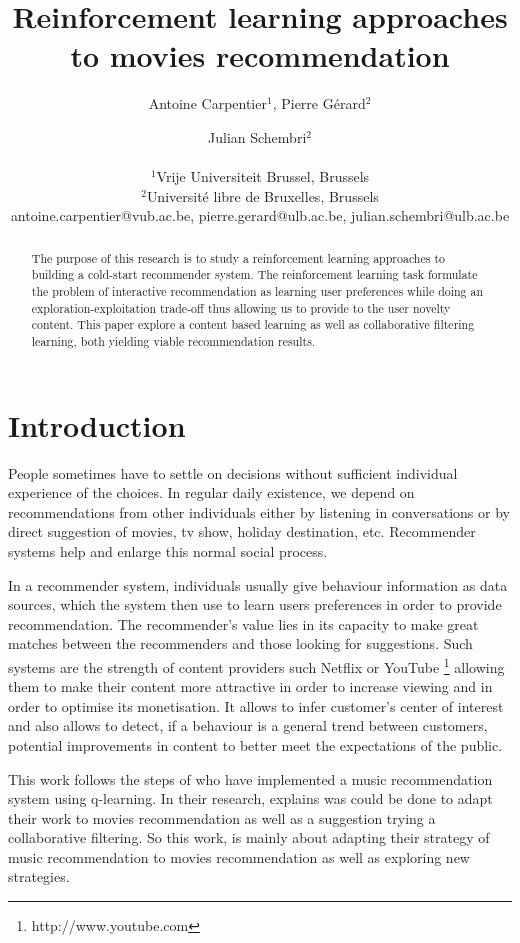 \documentclass[letterpaper]{article}
\title{Reinforcement learning approaches to movies recommendation}
\author{Antoine Carpentier$^{1}$, Pierre Gérard$^{2}$ \and Julian Schembri$^2$ \\
\mbox{}\\
$^1$Vrije Universiteit Brussel, Brussels \\
$^2$Université libre de Bruxelles, Brussels \\
antoine.carpentier@vub.ac.be, pierre.gerard@ulb.ac.be, julian.schembri@ulb.ac.be}
\begin{document}
\maketitle

\begin{abstract}
  The purpose of this research is to study a reinforcement learning approaches to building a cold-start recommender system. The reinforcement learning task formulate the problem of interactive recommendation as learning user preferences while doing an exploration-exploitation trade-off thus allowing us to provide to the user novelty content. This paper explore a content based learning as well as collaborative filtering learning, both yielding viable recommendation results.
\end{abstract}

\section{Introduction}


People sometimes have to settle on decisions without sufficient individual experience of the choices. In regular daily existence, we depend on  recommendations from other individuals either by listening in conversations or by direct suggestion of movies, tv show, holiday destination, etc. Recommender systems help and enlarge this normal social process. 

In a recommender system, individuals usually give behaviour information as data sources, which the system then use to learn users preferences in order to provide recommendation. The recommender's value lies in its capacity to make great matches between the recommenders and those looking for suggestions. Such systems are the strength of content providers such Netflix \cite{netflix-article-recommender} or YouTube \footnote{http://www.youtube.com} allowing them to make their content more attractive in order to increase viewing and in order to optimise its monetisation. It allows to infer customer's center of interest and also allows to detect, if a behaviour is a general trend between customers, potential improvements in content to better meet the expectations of the public. 


This work follows the steps of \cite{main} who have implemented a music recommendation system using q-learning. In their research, \cite{main} explains was could be done to adapt their work to movies recommendation as well as a suggestion trying a collaborative filtering. So this work, is mainly about adapting their strategy of music recommendation to movies recommendation as well as exploring new strategies.
\end{document}
